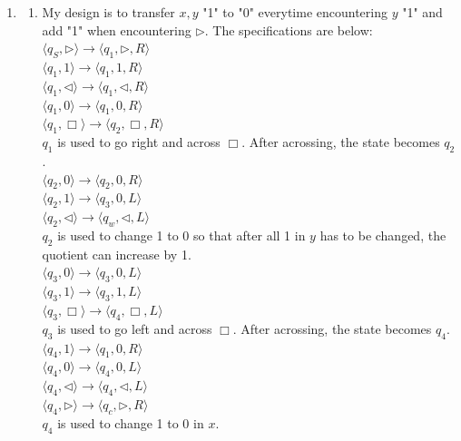 \documentclass[12pt,a4paper]{article}
\makeatletter
\newtheorem*{solution}{Solution}
\theoremstyle{definition}
\renewenvironment{solution}[1][Solution] {\par\pushQED{\qed}\normalfont\topsep6\p@\@plus6\p@\relax\trivlist\item[\hskip\labelsep\bfseries#1\@addpunct{.}]\ignorespaces}{\popQED\endtrivlist\@endpefalse} \makeatother
\makeatother
\begin{document}
\begin{enumerate}
    \begin{solution}
		\begin{enumerate}
			\item My design is to transfer $x,y$ "1" to "0" everytime encountering $y$ "1" and add "1" when encountering $\triangleright$. The specifications are below:\\
			$\langle q_S, \triangleright \rangle \rightarrow \langle q_1, \triangleright,  R\rangle$\\
			$\langle q_1, 1 \rangle \rightarrow \langle q_1, 1,  R\rangle$\\
			$\langle q_1, \triangleleft \rangle \rightarrow \langle q_1, \triangleleft,  R\rangle$\\
			$\langle q_1, 0 \rangle \rightarrow \langle q_1, 0,  R\rangle$\\
			$\langle q_1, \Box \rangle \rightarrow \langle q_2, \Box,  R\rangle$\\
			$q_1$ is used to go right and across $\Box$. After acrossing, the state becomes $q_2$.\\
			$\langle q_2, 0 \rangle \rightarrow \langle q_2, 0,  R\rangle$\\
			$\langle q_2, 1 \rangle \rightarrow \langle q_3, 0,  L\rangle$\\
			$\langle q_2, \triangleleft \rangle \rightarrow \langle q_w, \triangleleft,  L\rangle$\\
			$q_2$ is used to change 1 to 0 so that after all 1 in $y$ has to be changed, the quotient can increase by 1.\\
			$\langle q_3, 0 \rangle \rightarrow \langle q_3, 0,  L\rangle$\\
			$\langle q_3, 1 \rangle \rightarrow \langle q_3, 1,  L\rangle$\\
			$\langle q_3, \Box \rangle \rightarrow \langle q_4, \Box,  L\rangle$\\
			$q_3$ is used to go left and across $\Box$. After acrossing, the state becomes $q_4$.\\
			$\langle q_4, 1 \rangle \rightarrow \langle q_1, 0,  R\rangle$\\
			$\langle q_4, 0 \rangle \rightarrow \langle q_4, 0,  L\rangle$\\
			$\langle q_4, \triangleleft \rangle \rightarrow \langle q_4, \triangleleft,  L\rangle$\\
			$\langle q_4, \triangleright \rangle \rightarrow \langle q_c, \triangleright,  R\rangle$\\
			$q_4$ is used to change 1 to 0 in $x$.\\

\end{enumerate}
\end{solution}
\end{enumerate}
\end{document}
